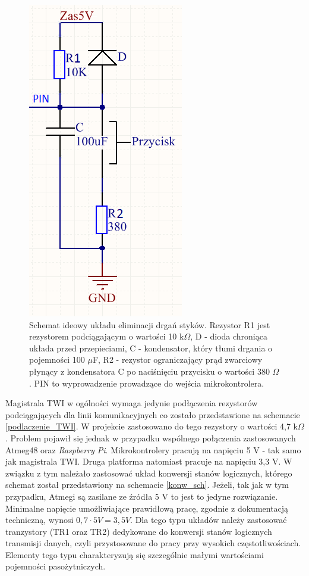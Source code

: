  \begin{figure}[H]
    \begin{center}
      \includegraphics[scale=0.45]{imgs/drgania.png}
 	\caption[Eliminacja drgań styków.]{\small{Schemat ideowy układu eliminacji drgań styków. Rezystor R1 jest rezystorem podciągającym o wartości 10 k$\Omega$, D - dioda chroniąca układa przed przepieciami, C - kondensator, który tłumi drgania o pojemności 100 $\mu$F, R2 - rezystor ograniczający prąd zwarciowy płynący z kondensatora C po naciśnięciu przycisku o wartości 380 $\Omega$. PIN to wyprowadzenie prowadzące do wejścia mikrokontrolera. }}
	\label{drg}
    \end{center}
  \end{figure}   
  
  Magistrala TWI w ogólności wymaga jedynie podłączenia rezystorów podciągających dla linii komunikacyjnych co zostało przedstawione na schemacie \ref{podlaczenie_TWI}. W projekcie zastosowano do tego rezystory o wartości 4,7 k$\Omega$. Problem pojawił się jednak w przypadku wspólnego połączenia zastosowanych Atmeg48 oraz \textit{Raspberry Pi}. Mikrokontrolery pracują na napięciu 5 V - tak samo jak magistrala TWI. Druga platforma natomiast pracuje na napięciu 3,3 V. W związku z tym należało zastosować układ konwersji stanów logicznych, którego schemat został przedstawiony na schemacie \ref{konw_sch}. Jeżeli, tak jak w tym przypadku, Atmegi są zasilane ze źródła 5 V to jest to jedyne rozwiązanie. Minimalne napięcie umożliwiające prawidłową pracę, zgodnie z dokumentacją techniczną, wynosi $0,7\cdot 5V = 3,5 V$. Dla tego typu układów należy zastosować tranzystory (TR1 oraz TR2) dedykowane do konwersji stanów logicznych transmisji danych, czyli przystosowane do pracy przy wysokich częstotliwościach. Elementy tego typu charakteryzują się szczególnie małymi wartościami pojemności pasożytniczych.
  
